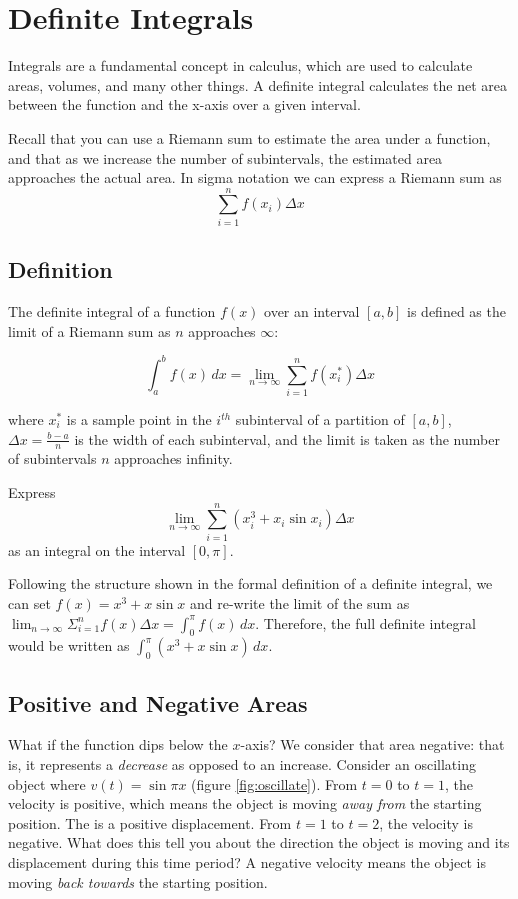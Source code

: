 \chapter{Definite Integrals}

Integrals are a fundamental concept in calculus, which are used to
calculate areas, volumes, and many other things. A definite integral
calculates the net area between the function and the x-axis over a
given interval.

Recall that you can use a Riemann sum to estimate the area under a 
function, and that as we increase the number of subintervals, the 
estimated area approaches the actual area. In sigma notation we can 
express a Riemann sum as $$\sum_{i=1}^{n} f(x_i)\Delta x$$

\section{Definition}

The definite integral of a function $f(x)$ over an interval $[a, b]$
is defined as the limit of a Riemann sum as $n$ approaches $\infty$:

\begin{equation}
\int_{a}^{b} f(x) \, dx = \lim_{{n \to \infty}} \sum_{i=1}^{n} 
f(x_i^*) \Delta x
\end{equation}

where $x_i^*$ is a sample point in the $i^{th}$ subinterval of a
partition of $[a, b]$, $\Delta x = \frac{b-a}{n}$ is the width of each
subinterval, and the limit is taken as the number of subintervals $n$
approaches infinity.

\begin{Exercise}[label=defint1]
Express $$\lim_{n \to \infty} \sum_{i=1}^{n} (x_i^3 + x_i\sin{x_i})
\Delta x$$ as an integral on the interval $[0, \pi]$. 
\end{Exercise}

\begin{Answer}[ref=defint1]
Following the structure shown in the formal definition of a definite 
integral, we can set $f(x) = x^3 + x\sin{x}$ and re-write the limit of 
the sum as $\lim_{n \to \infty} \Sigma_{i=1}^{n} f(x)\Delta x = 
\int_{0}^{\pi} f(x)\,dx$. Therefore, the full definite integral 
would be written as $\int_{0}^{\pi} (x^3 + x\sin{x})\, dx$. 
\end{Answer}

\section{Positive and Negative Areas}
What if the function dips below the $x$-axis? We consider that area 
negative: that is, it represents a \textit{decrease} as opposed to 
an increase. Consider an oscillating object where $v(t) = 
\sin{\pi x}$ (figure \ref{fig:oscillate}). From $t = 0$ to $t = 1$, 
the velocity is positive, which means the object is moving 
\textit{away from} the starting position. The is a positive 
displacement. From $t = 1$ to $t = 2$, the velocity is negative. What 
does this tell you about the direction the object is moving and its 
displacement during this time period? A negative velocity means the 
object is moving \textit{back towards} the starting position.

